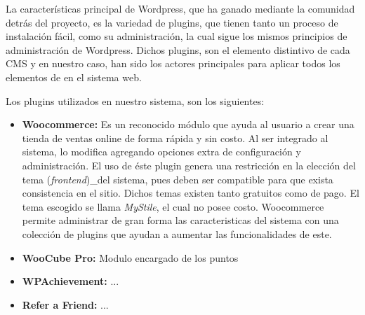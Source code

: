 La características principal de Wordpress, que ha ganado mediante
la comunidad detrás del proyecto, es la variedad de plugins, que
tienen tanto un proceso de instalación fácil, como su administración,
la cual sigue los mismos principios de administración de Wordpress.
Dichos plugins, son el elemento distintivo de cada CMS
y en nuestro caso, han sido los actores principales para aplicar
todos los elementos de {\GAM} en el sistema web.

Los plugins utilizados en nuestro sistema, son los siguientes:

\begin{itemize}
    \item {\bf Woocommerce:}
        Es un reconocido módulo que ayuda al usuario a crear una tienda de
        ventas online de forma rápida y sin costo.
        Al ser integrado al sistema, lo modifica agregando opciones
        extra de configuración y administración.
        El uso de éste plugin genera una restricción en la elección
        del tema (\emph{frontend})_del sistema, pues deben ser compatible
        para que exista consistencia en el sitio.
        Dichos temas existen tanto gratuitos como de pago.
        El tema escogido se llama \emph{MyStile}, el cual no posee costo.
        Woocommerce permite administrar de gran forma las caracteristicas del
        sistema con una colección de plugins que ayudan a aumentar las
        funcionalidades de este.

    \item {\bf WooCube Pro:}
        Modulo encargado de los puntos

    \item {\bf WPAchievement:}
        ...

    \item {\bf Refer a Friend:}
        ...

\end{itemize}

